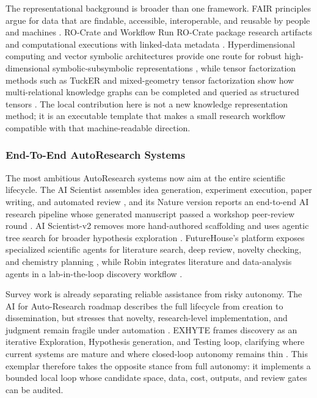 \documentclass[
]{article}
\begin{document}
The representational background is broader than one framework. FAIR
principles argue for data that are findable, accessible, interoperable,
and reusable by people and machines \citep{wilkinson2016fair}. RO-Crate
and Workflow Run RO-Crate package research artifacts and computational
executions with linked-data metadata
\citep{soiland_reyes2022rocrate, soiland_reyes2024workflow_run_rocrate}.
Hyperdimensional computing and vector symbolic architectures provide one
route for robust high-dimensional symbolic-subsymbolic representations
\citep{heddes_hdc_2024}, while tensor factorization methods such as
TuckER and mixed-geometry tensor factorization show how multi-relational
knowledge graphs can be completed and queried as structured tensors
\citep{balazevic_tucker_2019, yusupov_mixed_geometry_2025}. The local
contribution here is not a new knowledge representation method; it is an
executable template that makes a small research workflow compatible with
that machine-readable direction.

\subsubsection{End-To-End AutoResearch
Systems}\label{sec:end-to-end-autoresearch-systems}

The most ambitious AutoResearch systems now aim at the entire scientific
lifecycle. The AI Scientist assembles idea generation, experiment
execution, paper writing, and automated review
\citep{lu_aiscientist_2024}, and its Nature version reports an
end-to-end AI research pipeline whose generated manuscript passed a
workshop peer-review round \citep{lu_ai_scientist_nature_2026}. AI
Scientist-v2 removes more hand-authored scaffolding and uses agentic
tree search for broader hypothesis exploration
\citep{yamada_ai_scientist_v2_2025}. FutureHouse's platform exposes
specialized scientific agents for literature search, deep review,
novelty checking, and chemistry planning
\citep{futurehouse_platform_2025}, while Robin integrates literature and
data-analysis agents in a lab-in-the-loop discovery workflow
\citep{ghareeb_robin_2026}.

Survey work is already separating reliable assistance from risky
autonomy. The AI for Auto-Research roadmap describes the full lifecycle
from creation to dissemination, but stresses that novelty,
research-level implementation, and judgment remain fragile under
automation \citep{kong_ai_auto_research_2026}. EXHYTE frames discovery
as an iterative Exploration, Hypothesis generation, and Testing loop,
clarifying where current systems are mature and where closed-loop
autonomy remains thin \citep{hasib_exhyte_2025}. This exemplar therefore
takes the opposite stance from full autonomy: it implements a bounded
local loop whose candidate space, data, cost, outputs, and review gates
can be audited.
\end{document}
